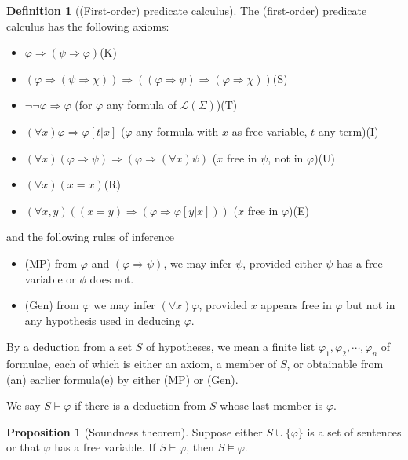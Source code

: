 \documentclass[a4paper]{article}
\theoremstyle{definition}
\newtheorem*{prop}{Proposition}
\newtheorem*{defi}{Definition}
\newcommand{\La}{\mathcal{L}}
\begin{document}
\begin{defi}[(First-order) predicate calculus]
  The (first-order) predicate calculus has the following axioms:
  \begin{itemize}
  \item $\varphi \Rightarrow (\psi \Rightarrow \varphi)$\hfill (K)
  \item $(\varphi \Rightarrow (\psi\Rightarrow \chi))\Rightarrow((\varphi\Rightarrow \psi)\Rightarrow (\varphi\Rightarrow \chi))$\hfill(S)
  \item $\neg\neg \varphi \Rightarrow \varphi$ (for $\varphi$ any formula of $\La(\Sigma)$)\hfill(T)
  \item $(\forall x)\varphi \Rightarrow \varphi[t|x]$ ($\varphi$ any formula with $x$ as free variable, $t$ any term)\hfill(I)
  \item $(\forall x)(\varphi\Rightarrow \psi) \Rightarrow (\varphi \Rightarrow (\forall x)\psi)$ ($x$ free in $\psi$, not in $\varphi$)\hfill(U)
  \item $(\forall x)(x = x)$\hfill(R)
  \item $(\forall x, y)((x = y)\Rightarrow(\varphi\Rightarrow \varphi[y|x]))$ ($x$ free in $\varphi$)\hfill(E)
  \end{itemize}
  and the following rules of inference
  \begin{itemize}
  \item (MP) from $\varphi$ and $(\varphi \Rightarrow \psi)$, we may infer $\psi$, provided either $\psi$ has a free variable or $\phi$ does not.
  \item (Gen) from $\varphi$ we may infer $(\forall x)\varphi$, provided $x$ appears free in $\varphi$ but not in any hypothesis used in deducing $\varphi$.
  \end{itemize}

  By a deduction from a set $S$ of hypotheses, we mean a finite list $\varphi_1, \varphi_2, \cdots, \varphi_n$ of formulae, each of which is either an axiom, a member of $S$, or obtainable from (an) earlier formula(e) by either (MP) or (Gen).

  We say $S\vdash \varphi$ if there is a deduction from $S$ whose last member is $\varphi$.
\end{defi}

\begin{prop}[Soundness theorem]
  Suppose either $S\cup \{\varphi\}$ is a set of sentences or that $\varphi$ has a free variable. If $S\vdash \varphi$, then $S\models \varphi$. 
\end{prop}
\end{document}

